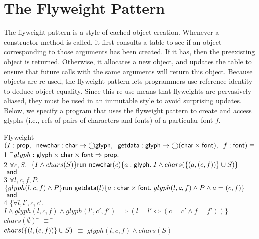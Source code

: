 \documentclass[preprint,natbib]{sigplanconf}
\begin{document}
\section{The Flyweight Pattern}
The flyweight pattern is a style of cached object creation. Whenever a
constructor method is called, it first consults a table to see if an
object corresponding to those arguments has been created. If it has,
then the preexisting object is returned.  Otherwise, it allocates a
new object, and updates the table to ensure that future calls with the same
arguments will return this object. Because objects are re-used, the
flyweight pattern lets programmers use reference identity to deduce
object equality. Since this re-use means that flyweights are
pervasively aliased, they must be used in an immutable style to avoid
surprising updates.
%
%
Below, we specify a program that uses the flyweight pattern to create
and access glyphs (i.e., refs of pairs of characters and fonts)
of a particular font $f$.  {\small
\begin{tabbing}
Flyweight$(I : \mbox{\textsf{{prop}}},\;\;
\mbox{\textsf{{newchar}}} : \mbox{\textsf{{char}}} \to \bigcirc{\mbox{\textsf{{glyph}}}},\;\; 
\mbox{\textsf{{getdata}}} : \mbox{\textsf{{glyph}}} \to \bigcirc{(\mbox{\textsf{{char}}}\times \mbox{\textsf{{font}}})},\;\;
f:\mbox{\textsf{{font}}}) \equiv$ \\
1 \qquad \=$\exists $\=$glyph : \mbox{\textsf{{glyph}}} \times \mbox{\textsf{{char}}} \times \mbox{\textsf{{font}}} \Rightarrow \mbox{\textsf{{prop}}}.$ 
\\[0.5em]

2  \> \> $\forall c, S.\;$\=
         $\{{I \land chars(S)}\}
          \mbox{\textsf{{run }}}{\mbox{\textsf{{newchar}}}(c)}
          \{{a:\mbox{\textsf{{glyph}}}.\; 
                 I \land chars(\{{(a, (c,f))}\} \cup S)}\}$ \\
  \> \!$\mbox{\textsf{{ and }}}$ \\
3 \> $\forall l, c, f, P.\;$\=
   $\{{glyph(l, c, f) \land P}\}
    \mbox{\textsf{{run }}}{\mbox{\textsf{{getdata}}}(l)}
    \{{a:\mbox{\textsf{{char}}} \times \mbox{\textsf{{font}}}.\; glyph(l, c, f) \land P \land a = (c,f)}\}$
\\
  \> \!$\mbox{\textsf{{ and }}}$ \\
4 \> $\{\forall l, l', c, c'.\;$\=$I \land glyph(l,c,f) \land glyph(l',c',f')
 \implies \left(l = l' \iff (c = c'\land f=f')\right)\}$ \\[0.5em]

$chars(\emptyset)$ \qquad\qquad\qquad \;\;\= $\equiv$ \= $\top$ \\
$chars(\{{(l,(c,f))}\} \cup S)$ \> $\equiv$ \> $glyph(l,c,f) \land chars(S)$ \\
\end{tabbing}
}
\end{document}
